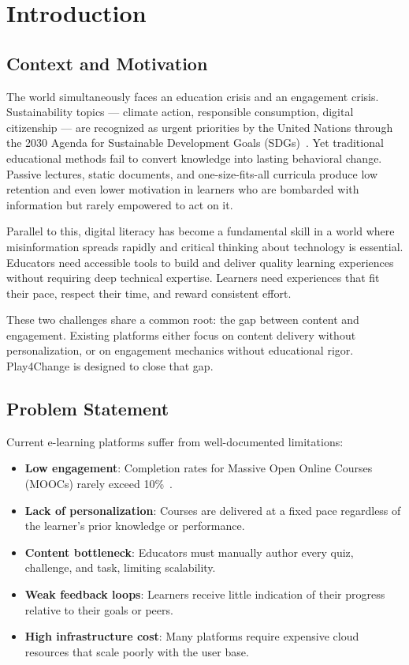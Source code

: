 %
%
\chapter{Introduction}
\label{cha:introduction}

\section{Context and Motivation}
\label{sec:context}

The world simultaneously faces an education crisis and an engagement crisis. Sustainability topics — climate action, responsible consumption, digital citizenship — are recognized as urgent priorities by the United Nations through the 2030 Agenda for Sustainable Development Goals (SDGs)~\cite{unsdgs2015}. Yet traditional educational methods fail to convert knowledge into lasting behavioral change. Passive lectures, static documents, and one-size-fits-all curricula produce low retention and even lower motivation in learners who are bombarded with information but rarely empowered to act on it.

Parallel to this, digital literacy has become a fundamental skill in a world where misinformation spreads rapidly and critical thinking about technology is essential. Educators need accessible tools to build and deliver quality learning experiences without requiring deep technical expertise. Learners need experiences that fit their pace, respect their time, and reward consistent effort.

These two challenges share a common root: the gap between content and engagement. Existing platforms either focus on content delivery without personalization, or on engagement mechanics without educational rigor. Play4Change is designed to close that gap.

\section{Problem Statement}
\label{sec:problem}

Current e-learning platforms suffer from well-documented limitations:
\begin{itemize}
    \item \textbf{Low engagement}: Completion rates for Massive Open Online Courses (MOOCs) rarely exceed 10\%~\cite{jordan2014initial}.
    \item \textbf{Lack of personalization}: Courses are delivered at a fixed pace regardless of the learner's prior knowledge or performance.
    \item \textbf{Content bottleneck}: Educators must manually author every quiz, challenge, and task, limiting scalability.
    \item \textbf{Weak feedback loops}: Learners receive little indication of their progress relative to their goals or peers.
    \item \textbf{High infrastructure cost}: Many platforms require expensive cloud resources that scale poorly with the user base.
\end{itemize}


